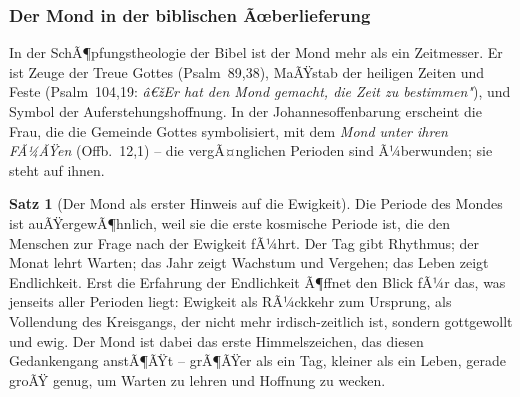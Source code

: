 ﻿\documentclass[a4paper,12pt]{article}
\theoremstyle{definition}
\newtheorem{theorem}{Satz}[section]
\begin{document}
\subsubsection{Der Mond in der biblischen Ãœberlieferung}

In der SchÃ¶pfungstheologie der Bibel ist der Mond mehr als ein Zeitmesser. Er ist
Zeuge der Treue Gottes (Psalm~89,38), MaÃŸstab der heiligen Zeiten und Feste
(Psalm~104,19: \textit{â€žEr hat den Mond gemacht, die Zeit zu bestimmen"}), und
Symbol der Auferstehungshoffnung. In der Johannesoffenbarung erscheint die Frau,
die die Gemeinde Gottes symbolisiert, mit dem \textit{Mond unter ihren FÃ¼ÃŸen}
(Offb.~12,1) -- die vergÃ¤nglichen Perioden sind Ã¼berwunden; sie steht auf ihnen.

\begin{theorem}[Der Mond als erster Hinweis auf die Ewigkeit]
	Die Periode des Mondes ist auÃŸergewÃ¶hnlich, weil sie die erste kosmische
	Periode ist, die den Menschen zur Frage nach der Ewigkeit fÃ¼hrt. Der Tag gibt
	Rhythmus; der Monat lehrt Warten; das Jahr zeigt Wachstum und Vergehen; das
	Leben zeigt Endlichkeit. Erst die Erfahrung der Endlichkeit Ã¶ffnet den Blick
	fÃ¼r das, was jenseits aller Perioden liegt: Ewigkeit als RÃ¼ckkehr zum Ursprung,
	als Vollendung des Kreisgangs, der nicht mehr irdisch-zeitlich ist, sondern
	gottgewollt und ewig. Der Mond ist dabei das erste Himmelszeichen, das diesen
	Gedankengang anstÃ¶ÃŸt -- grÃ¶ÃŸer als ein Tag, kleiner als ein Leben, gerade groÃŸ
	genug, um Warten zu lehren und Hoffnung zu wecken.
\end{theorem}
\end{document}
